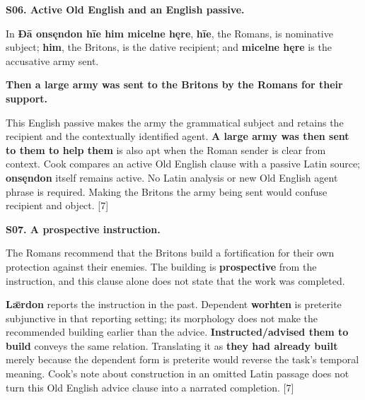 \par\begin{minipage}{\linewidth}\raggedright
\textbf{S06. Active Old English and an English passive.}

In \textbf{Ðā onsęndon hīe him micelne hęre}, \textbf{hīe}, the Romans, is nominative subject; \textbf{him}, the Britons, is the dative recipient; and \textbf{micelne hęre} is the accusative army sent.

\textbf{Then a large army was sent to the Britons by the Romans for their support.}

This English passive makes the army the grammatical subject and retains the recipient and the contextually identified agent. \textbf{A large army was then sent to them to help them} is also apt when the Roman sender is clear from context. Cook compares an active Old English clause with a passive Latin source; \textbf{onsęndon} itself remains active. No Latin analysis or new Old English agent phrase is required. Making the Britons the army being sent would confuse recipient and object. [7]

\end{minipage}\par\addvspace{4pt}

\par\begin{minipage}{\linewidth}\raggedright
\textbf{S07. A prospective instruction.}

The Romans recommend that the Britons build a fortification for their own protection against their enemies. The building is \textbf{prospective} from the instruction, and this clause alone does not state that the work was completed.

\textbf{Lǣrdon} reports the instruction in the past. Dependent \textbf{worhten} is preterite subjunctive in that reporting setting; its morphology does not make the recommended building earlier than the advice. \textbf{Instructed/\allowbreak{}advised them to build} conveys the same relation. Translating it as \textbf{they had already built} merely because the dependent form is preterite would reverse the task's temporal meaning. Cook's note about construction in an omitted Latin passage does not turn this Old English advice clause into a narrated completion. [7]

\end{minipage}\par\addvspace{4pt}

